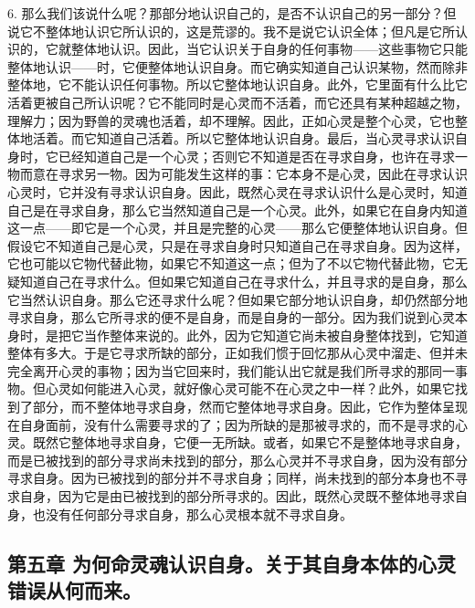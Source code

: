 6. 那么我们该说什么呢？那部分地认识自己的，是否不认识自己的另一部分？但说它不整体地认识它所认识的，这是荒谬的。我不是说它认识全体；但凡是它所认识的，它就整体地认识。因此，当它认识关于自身的任何事物——这些事物它只能整体地认识——时，它便整体地认识自身。而它确实知道自己认识某物，然而除非整体地，它不能认识任何事物。所以它整体地认识自身。此外，它里面有什么比它活着更被自己所认识呢？它不能同时是心灵而不活着，而它还具有某种超越之物，理解力；因为野兽的灵魂也活着，却不理解。因此，正如心灵是整个心灵，它也整体地活着。而它知道自己活着。所以它整体地认识自身。最后，当心灵寻求认识自身时，它已经知道自己是一个心灵；否则它不知道是否在寻求自身，也许在寻求一物而意在寻求另一物。因为可能发生这样的事：它本身不是心灵，因此在寻求认识心灵时，它并没有寻求认识自身。因此，既然心灵在寻求认识什么是心灵时，知道自己是在寻求自身，那么它当然知道自己是一个心灵。此外，如果它在自身内知道这一点——即它是一个心灵，并且是完整的心灵——那么它便整体地认识自身。但假设它不知道自己是心灵，只是在寻求自身时只知道自己在寻求自身。因为这样，它也可能以它物代替此物，如果它不知道这一点；但为了不以它物代替此物，它无疑知道自己在寻求什么。但如果它知道自己在寻求什么，并且寻求的是自身，那么它当然认识自身。那么它还寻求什么呢？但如果它部分地认识自身，却仍然部分地寻求自身，那么它所寻求的便不是自身，而是自身的一部分。因为我们说到心灵本身时，是把它当作整体来说的。此外，因为它知道它尚未被自身整体找到，它知道整体有多大。于是它寻求所缺的部分，正如我们惯于回忆那从心灵中溜走、但并未完全离开心灵的事物；因为当它回来时，我们能认出它就是我们所寻求的那同一事物。但心灵如何能进入心灵，就好像心灵可能不在心灵之中一样？此外，如果它找到了部分，而不整体地寻求自身，然而它整体地寻求自身。因此，它作为整体呈现在自身面前，没有什么需要寻求的了；因为所缺的是那被寻求的，而不是寻求的心灵。既然它整体地寻求自身，它便一无所缺。或者，如果它不是整体地寻求自身，而是已被找到的部分寻求尚未找到的部分，那么心灵并不寻求自身，因为没有部分寻求自身。因为已被找到的部分并不寻求自身；同样，尚未找到的部分本身也不寻求自身，因为它是由已被找到的部分所寻求的。因此，既然心灵既不整体地寻求自身，也没有任何部分寻求自身，那么心灵根本就不寻求自身。\par


\subsection{第五章 为何命灵魂认识自身。关于其自身本体的心灵错误从何而来。}

